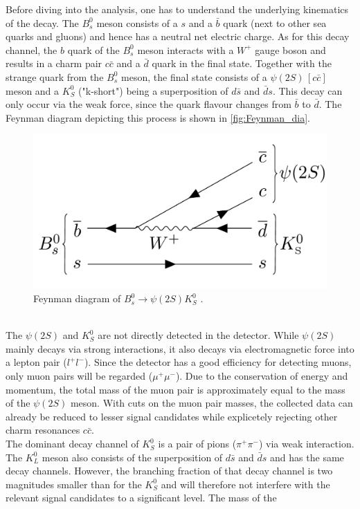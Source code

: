 Before diving into the analysis, one has to understand the underlying kinematics of the decay. The $B_s^0$ meson consists of a $s$ and a $\bar{b}$ quark (next to other sea quarks and gluons) and hence
has a neutral net electric charge. As for this decay channel, the $b$ quark of the $B_s^0$ meson interacts with a $W^+$ gauge boson and results in a charm pair $c \bar{c}$ and a $\bar{d}$ quark in the 
final state. Together with the strange quark from the $B_s^0$ meson, the final state consists of a $\psi (2S) \, [c \bar{c}]$ meson and a $K_S^0$ ("k-short") being a superposition of $d\bar{s}$ and $\bar{d}s$.
This decay can only occur via the weak force, since the quark flavour changes from $\bar{b}$ to $\bar{d}$. The Feynman diagram depicting this process is shown in \autoref{fig:Feynman_dia}.
\begin{figure}
    \centering
    \includegraphics[width = .5\textwidth]{"content/pics/Feynman.png"}
    \caption{Feynman diagram of $B_s^0 \to \psi (2S)K_S^0$ \cite{LHCb_MVA}.}
    \label{fig:Feynman_dia}
  \end{figure}
\\The $\psi (2S)$ and $K_S^0$ are not directly detected in the detector. While $\psi (2S)$ mainly decays via strong interactions, it also decays via
electromagnetic force into a lepton pair ($l^+l^-$).
Since the detector has a good efficiency for detecting muons, only muon pairs will be regarded ($\mu^+\mu^-$). Due to the conservation of energy and momentum, the 
total mass of the muon pair is approximately equal to the mass of the $\psi (2S)$ meson. With cuts on the muon pair masses, the collected data can already be reduced to lesser signal candidates while explicetely
rejecting other charm resonances $c\bar{c}$.\\
The dominant decay channel of $K_S^0$ is a pair of pions ($\pi^+\pi^-$) via weak interaction. The $K_L^0$ meson also consists of the superposition of $d\bar{s}$ and $\bar{d}s$ and has the same decay channels.
However, the branching fraction of that decay channel is two magnitudes smaller than for the $K_S^0$ and will therefore not interfere with the relevant signal candidates to a significant level. The mass of the
